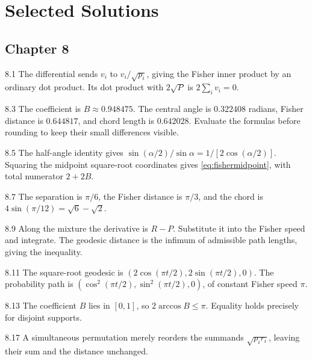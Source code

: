 \documentclass[11pt,oneside,openany]{book}
\theoremstyle{definition}
\theoremstyle{remark}
\newenvironment{answers}{\begin{description}[leftmargin=2.9em,labelwidth=2.5em,labelsep=.4em,itemsep=8pt,font=\normalfont\bfseries]}{\end{description}}
\numberwithin{equation}{chapter}
\begin{document}
\clearpage\backmatter
\chapter*{Selected Solutions}
\section*{Chapter 8}
\begin{answers}
\item[8.1] The differential sends $v_i$ to $v_i/\sqrt{p_i}$, giving the Fisher inner product by an ordinary dot product. Its dot product with $2\sqrt P$ is $2\sum_i v_i=0$.
\item[8.3] The coefficient is $B\approx0.948475$. The central angle is $0.322408$ radians, Fisher distance is $0.644817$, and chord length is $0.642028$. Evaluate the formulas before rounding to keep their small differences visible.
\item[8.5] The half-angle identity gives $\sin(\alpha/2)/\sin\alpha=1/[2\cos(\alpha/2)]$. Squaring the midpoint square-root coordinates gives \eqref{eq:fishermidpoint}, with total numerator $2+2B$.
\item[8.7] The separation is $\pi/6$, the Fisher distance is $\pi/3$, and the chord is $4\sin(\pi/12)=\sqrt6-\sqrt2$.
\item[8.9] Along the mixture the derivative is $R-P$. Substitute it into the Fisher speed and integrate. The geodesic distance is the infimum of admissible path lengths, giving the inequality.
\item[8.11] The square-root geodesic is $(2\cos(\pi t/2),2\sin(\pi t/2),0)$. The probability path is $(\cos^2(\pi t/2),\sin^2(\pi t/2),0)$, of constant Fisher speed $\pi$.
\item[8.13] The coefficient $B$ lies in $[0,1]$, so $2\arccos B\leq\pi$. Equality holds precisely for disjoint supports.
\item[8.17] A simultaneous permutation merely reorders the summands $\sqrt{p_ir_i}$, leaving their sum and the distance unchanged.
\end{answers}
\end{document}
